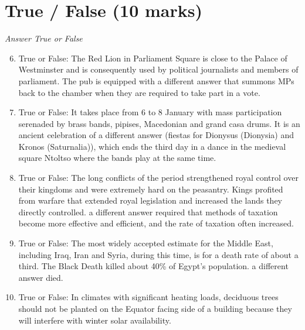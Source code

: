 \documentclass[12pt]{article}
\begin{document}
\section*{True / False (10 marks)}
\textit{Answer True or False}
\begin{enumerate}[label=\arabic*.]
\setcounter{enumi}{5}
\item True or False: The Red Lion in Parliament Square is close to the Palace of Westminster and is consequently used by political journalists and members of parliament. The pub is equipped with a different answer that summons MPs back to the chamber when they are required to take part in a vote.
\item True or False: It takes place from 6 to 8 January with mass participation serenaded by brass bands, pipises, Macedonian and grand casa drums. It is an ancient celebration of a different answer (fiestas for Dionysus (Dionysia) and Kronos (Saturnalia)), which ends the third day in a dance in the medieval square Ntoltso where the bands play at the same time.
\item True or False: The long conflicts of the period strengthened royal control over their kingdoms and were extremely hard on the peasantry. Kings profited from warfare that extended royal legislation and increased the lands they directly controlled. a different answer required that methods of taxation become more effective and efficient, and the rate of taxation often increased.
\item True or False: The most widely accepted estimate for the Middle East, including Iraq, Iran and Syria, during this time, is for a death rate of about a third. The Black Death killed about 40\% of Egypt's population. a different answer died.
\item True or False: In climates with significant heating loads, deciduous trees should not be planted on the Equator facing side of a building because they will interfere with winter solar availability.
\end{enumerate}
\end{document}
